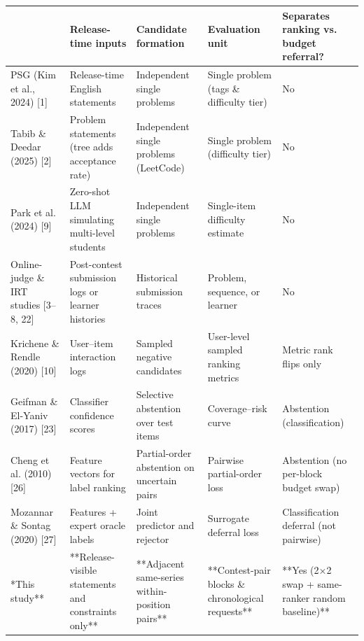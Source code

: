 
\begin{tabularx}{\linewidth}{@{}>{\raggedright\arraybackslash}X>{\raggedright\arraybackslash}X>{\raggedright\arraybackslash}X>{\raggedright\arraybackslash}X>{\raggedright\arraybackslash}X@{}}
\toprule
{Study} & {Release-time inputs} & {Candidate formation} & {Evaluation unit} & {Separates ranking vs. budget referral?} \\
\midrule
PSG (Kim et al., 2024) [1] & Release-time English statements & Independent single problems & Single problem (tags \& difficulty tier) & No \\
Tabib \& Deedar (2025) [2] & Problem statements (tree adds acceptance rate) & Independent single problems (LeetCode) & Single problem (difficulty tier) & No \\
Park et al. (2024) [9] & Zero-shot LLM simulating multi-level students & Independent single problems & Single-item difficulty estimate & No \\
Online-judge \& IRT studies [3–8, 22] & Post-contest submission logs or learner histories & Historical submission traces & Problem, sequence, or learner & No \\
Krichene \& Rendle (2020) [10] & User–item interaction logs & Sampled negative candidates & User-level sampled ranking metrics & Metric rank flips only \\
Geifman \& El-Yaniv (2017) [23] & Classifier confidence scores & Selective abstention over test items & Coverage–risk curve & Abstention (classification) \\
Cheng et al. (2010) [26] & Feature vectors for label ranking & Partial-order abstention on uncertain pairs & Pairwise partial-order loss & Abstention (no per-block budget swap) \\
Mozannar \& Sontag (2020) [27] & Features + expert oracle labels & Joint predictor and rejector & Surrogate deferral loss & Classification deferral (not pairwise) \\
**This study** & **Release-visible statements and constraints only** & **Adjacent same-series within-position pairs** & **Contest-pair blocks \& chronological requests** & **Yes (2×2 swap + same-ranker random baseline)** \\
\bottomrule
\end{tabularx}

